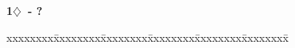 \documentclass[10pt]{article}
\renewcommand{\c}{$\clubsuit$}
\renewcommand{\d}{$\diamondsuit$}
\newcommand{\h}{$\heartsuit$}
\newcommand{\s}{$\spadesuit$}
\newcommand{\p}{\textsuperscript{+}}
\newcommand{\x}{DBL}
\newenvironment{bidtable}[1][]
{\textbf{#1}
  \begin{adjustwidth}{1em}{}
    \addvspace{2pt}
    \begin{tabbing}
      xxxxxxxx\=xxxxxxxx\=xxxxxxxx\=xxxxxxxx\=xxxxxxxx\=xxxxxxxx\=\kill}
{\end{tabbing}\end{adjustwidth}\bigskip}%
\begin{document}
\begin{multicols*}{2}
\begin{bidtable}[1\d\ - ?]
\end{bidtable}


\end{multicols*}
\end{document}
